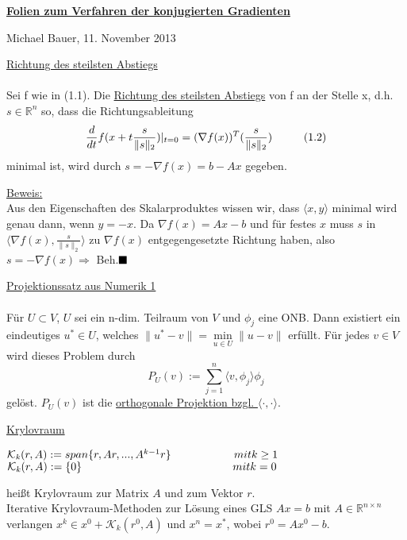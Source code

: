 \documentclass[a4paper]{letter}
\begin{document}
\begin{center}
	\underline{
		\textbf{
			\large{
				Folien zum Verfahren der konjugierten Gradienten
			}
		}
	}
\end{center}

\begin{center}
Michael Bauer, 11. November 2013
\end{center}

\parskip 20pt

\underline{Richtung des steilsten Abstiegs}
\\\\Sei f wie in (1.1). Die \underline{Richtung des steilsten Abstiegs} von f an der Stelle x, d.h. $s\in\mathbb{R}^{n}$ so, dass die Richtungsableitung
$$\frac d {dt} f(x+t\frac s {\|s\|_{2}})|_{t=0} = (\nabla f(x))^{T} (\frac s {\|s\|_{2}}) \hspace{10mm}(1.2)$$
minimal ist, wird durch $s = -\nabla f(x) = b - Ax$ gegeben.

\underline{Beweis:}
\\Aus den Eigenschaften des Skalarproduktes wissen wir, dass $\langle x, y \rangle$ minimal wird genau dann, wenn $y = -x$. Da $\nabla f(x) = Ax - b$ und f\"ur festes $x$ muss $s$ in $\langle {\nabla f(x)}, {\frac s {\|s\|_{2}}} \rangle$ zu $\nabla f(x)$ entgegengesetzte Richtung haben, also $s = -\nabla f(x) \Rightarrow$ Beh.$\hfill \blacksquare$

\parskip 20pt

\underline{Projektionssatz aus Numerik 1}
\\\\F\"ur $U \subset V$, $U$ sei ein n-dim. Teilraum von $V$ und $\phi_{j}$ eine ONB. Dann existiert ein eindeutiges $u^{*} \in U$, welches $\|u^{*} - v\| = \underset{u \in U}{\min} \|u - v\|$ erf\"ullt. F\"ur jedes $v \in V$ wird dieses Problem durch
$$P_{U}(v) := \sum_{j=1}^{n} \langle v, \phi_{j} \rangle \phi_{j}$$
gel\"ost. $P_{U}(v)$ ist die \underline{orthogonale Projektion bzgl. $\langle \cdot, \cdot \rangle$}.

\parskip 20pt

\underline{Krylovraum}
\begin{addmargin}[20mm]{20mm}
$\mathcal{K}_{\mathit{k}}(r, A) := span\{r, Ar, ..., A^{k-1}r\} \hspace{20mm} mit \hfill k \ge 1$
\\$\mathcal{K}_{\mathit{k}}(r, A) := \{0\} \hspace{48mm} mit \hfill k = 0$
\end{addmargin}
hei{\ss}t Krylovraum zur Matrix $A$ und zum Vektor $r$.
\\Iterative Krylovraum-Methoden zur L\"osung eines GLS $Ax = b$ mit $A \in \mathbb{R}^{n \times n}$ verlangen $x^k \in x^{0} + \mathcal{K}_{\mathit{k}}(r^{0}, A)$ und $x^{n} = x^{*}$, wobei $r^{0} = Ax^{0} - b$.
\end{document}

